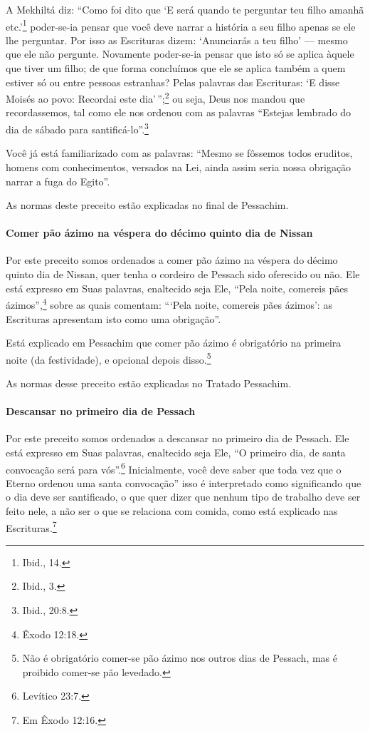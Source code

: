 A Mekhiltá diz: ``Como foi dito que `E será quando te perguntar teu
filho amanhã etc.'\footnote{Ibid., 14.} poder-se-ia pensar que você deve narrar a
história a seu filho apenas se ele lhe perguntar. Por isso as Escrituras
dizem: `Anunciarás a teu filho' --- mesmo que ele não pergunte.
Novamente poder-se-ia pensar que isto só se aplica àquele que tiver um
filho; de que forma concluímos que ele se aplica também a quem estiver
só ou entre pessoas estranhas? Pelas palavras das Escrituras: `E disse
Moisés ao povo: Recordai este dia'\,'';\footnote{Ibid., 3.} ou seja, Deus nos
mandou que recordassemos, tal como ele nos ordenou com as palavras
``Estejas lembrado do dia de sábado para santificá-lo''.\footnote{Ibid., 20:8.}

Você já está familiarizado com as palavras: ``Mesmo se fôssemos todos
eruditos, homens com conhecimentos, versados na Lei, ainda assim seria
nossa obrigação narrar a fuga do Egito''.

As normas deste preceito estão explicadas no final de Pessachim.

\paragraph{Comer pão ázimo na véspera do décimo quinto dia de Nissan}

Por este preceito somos ordenados a comer pão ázimo na véspera do décimo
quinto dia de Nissan, quer tenha o cordeiro de Pessach sido oferecido ou não. Ele está expresso em Suas palavras, enaltecido seja Ele,
``Pela noite, comereis pães ázimos'',\footnote{Êxodo 12:18.} sobre as quais
comentam: ```Pela noite, comereis pães ázimos': as Escrituras apresentam
isto como uma obrigação''.

Está explicado em Pessachim que comer pão ázimo é obrigatório na primeira
noite (da festividade), e opcional depois disso.\footnote{Não é obrigatório comer-se pão ázimo nos outros dias de Pessach, mas é proibido comer-se pão levedado.}

As normas desse preceito estão explicadas no Tratado Pessachim.

\paragraph{Descansar no primeiro dia de Pessach}

Por este preceito somos ordenados a descansar no primeiro dia de
Pessach. Ele está expresso em Suas palavras, enaltecido seja Ele, ``O
primeiro dia, de santa convocação será para vós''.\footnote{Levítico 23:7.}
Inicialmente, você deve saber que toda vez que o Eterno ordenou uma
santa convocação'' isso é interpretado como significando que o dia deve ser santificado, o que quer dizer que nenhum tipo de trabalho deve ser feito nele, a não ser o que se relaciona com comida, como está explicado nas Escrituras.\footnote{Em Êxodo 12:16.}


